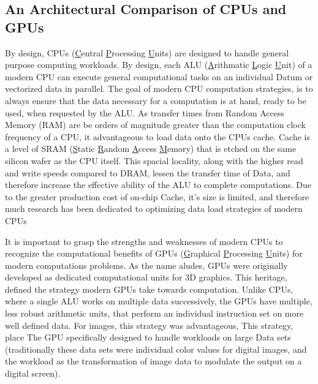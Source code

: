 \subsection{An Architectural Comparison of CPUs and GPUs}

By design, CPUs (\underline{C}entral \underline{P}rocessing \underline{U}nits) are designed
to handle general purpose computing workloads.
By design, each ALU (\underline{A}rithmatic \underline{L}ogic \underline{U}nit) of a modern CPU can execute general computational
tasks on an individual Datum or vectorized data in parallel.
The goal of modern CPU computation strategies, is to always ensure that the data
necessary for a computation is at hand, ready to be used, when requested by the ALU.
As transfer times from Random Access Memory
(RAM) are be orders of magnitude greater than the computation clock frequency of
a CPU, it advantageous to load data onto the CPUs cache. Cache is a level of
SRAM (\underline{S}tatic \underline{R}andom \underline{A}ccess \underline{M}emory)
that is etched on the same silicon wafer as the CPU itself.  This spacial locality,
along with the higher read and write speeds compared to DRAM, lessen the transfer
time of Data, and therefore increase the effective ability of the ALU to complete computations.
Due to the greater production cost of on-chip Cache, it's size is limited, and therefore
much research has been dedicated to optimizing data load strategies of modern CPUs
\par

It is important to grasp the strengths and weaknesses of modern CPUs to
recognize the computational benefits of GPUs (\underline{G}raphical \underline{P}rocessing \underline{U}nits)
for modern computations problems.  As the name aludes, GPUs were originally developed
as dedicated computational units for 3D graphics\cite{Sanders}.  This heritage,
defined the strategy modern GPUs take towards computation.  Unlike CPUs, where a
single ALU works on multiple data successively, the GPUs have multiple, less robust
arithmetic units, that perform an individual instruction set on more well defined data.
For images, this strategy was advantageous,
This strategy, place
The GPU specifically designed to handle workloads on large Data sets (traditionally these
data sets were individual color values for digital images, and the workload as
the transformation of image data to modulate the output on a digital screen).
